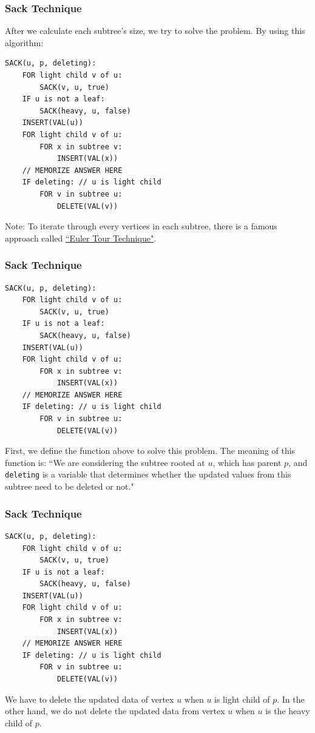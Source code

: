\begin{frame}[fragile]
\frametitle{Sack Technique}  
After we calculate each subtree's size, we try to solve the problem. By using this algorithm:

\begin{small}
\begin{verbatim}
SACK(u, p, deleting):
    FOR light child v of u:
        SACK(v, u, true)
    IF u is not a leaf:
        SACK(heavy, u, false) 
    INSERT(VAL(u))
    FOR light child v of u:
        FOR x in subtree v:
            INSERT(VAL(x))
    // MEMORIZE ANSWER HERE
    IF deleting: // u is light child
        FOR v in subtree u:
            DELETE(VAL(v))
\end{verbatim}
\end{small}

Note: To iterate through every vertices in each subtree, there is a famous approach called \href{https://en.wikipedia.org/wiki/Euler_tour_technique}{``Euler Tour Technique"}.

\end{frame}

\begin{frame}[fragile]
\frametitle{Sack Technique}  

\begin{small}
\begin{verbatim}
SACK(u, p, deleting):
    FOR light child v of u:
        SACK(v, u, true)
    IF u is not a leaf:
        SACK(heavy, u, false) 
    INSERT(VAL(u))
    FOR light child v of u:
        FOR x in subtree v:
            INSERT(VAL(x))
    // MEMORIZE ANSWER HERE
    IF deleting: // u is light child
        FOR v in subtree u:
            DELETE(VAL(v))
\end{verbatim}
\end{small}

First, we define the function above to solve this problem. The meaning of this function is: ``We are considering the subtree rooted at $u$, which has parent $p$, and \verb|deleting| is a variable that determines whether the updated values from this subtree need to be deleted or not."
    
\end{frame}

\begin{frame}[fragile]
\frametitle{Sack Technique}  

\begin{small}
\begin{verbatim}
SACK(u, p, deleting):
    FOR light child v of u:
        SACK(v, u, true)
    IF u is not a leaf:
        SACK(heavy, u, false) 
    INSERT(VAL(u))
    FOR light child v of u:
        FOR x in subtree v:
            INSERT(VAL(x))
    // MEMORIZE ANSWER HERE
    IF deleting: // u is light child
        FOR v in subtree u:
            DELETE(VAL(v))
\end{verbatim}
\end{small}

We have to delete the updated data of vertex $u$ when $u$ is light child of $p$. In the other hand, we do not delete the updated data from vertex $u$ when $u$ is the heavy child of $p$.
    
\end{frame}

